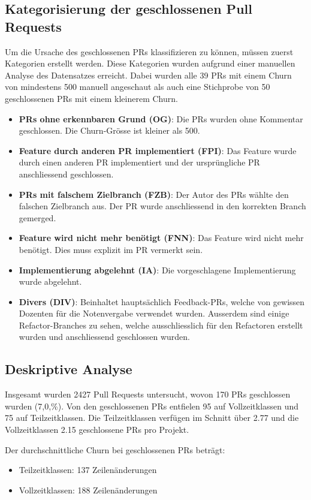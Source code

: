 \subsection{Kategorisierung der geschlossenen Pull Requests}
\label{sec:KategorienGeschlossenePRs} 
Um die Ursache des geschlossenen PRs klassifizieren zu können, müssen zuerst Kategorien erstellt werden. Diese Kategorien wurden aufgrund einer manuellen Analyse des Datensatzes erreicht. Dabei wurden alle 39 PRs mit einem Churn von mindestens 500 manuell angeschaut als auch eine Stichprobe von 50 geschlossenen PRs mit einem kleinerem Churn.
\begin{itemize}
    \item \textbf{PRs ohne erkennbaren Grund (OG)}: Die PRs wurden ohne Kommentar geschlossen. Die Churn-Grösse ist kleiner als 500.
    \item \textbf{Feature durch anderen PR implementiert (FPI)}: Das Feature wurde durch einen anderen PR implementiert und der ursprüngliche PR anschliessend geschlossen.
    \item \textbf{PRs mit falschem Zielbranch (FZB)}: Der Autor des PRs wählte den falschen Zielbranch aus. Der PR wurde anschliessend in den korrekten Branch gemerged.
    \item \textbf{Feature wird nicht mehr benötigt (FNN)}: Das Feature wird nicht mehr benötigt. Dies muss explizit im PR vermerkt sein.
    \item \textbf{Implementierung abgelehnt (IA)}: Die vorgeschlagene Implementierung wurde abgelehnt.
    \item \textbf{Divers (DIV)}: Beinhaltet hauptsächlich Feedback-PRs, welche von gewissen Dozenten für die Notenvergabe verwendet wurden. Ausserdem sind einige Refactor-Branches zu sehen, welche ausschliesslich für den Refactoren erstellt wurden und anschliessend geschlossen wurden. 
\end{itemize}

\subsection{Deskriptive Analyse}
Insgesamt wurden 2427 Pull Requests untersucht, wovon 170 PRs geschlossen wurden (7,0,\%). Von den geschlossenen PRs entfielen 95 auf Vollzeitklassen und 75 auf Teilzeitklassen. Die Teilzeitklassen verfügen im Schnitt über 2.77 und die Vollzeitklassen 2.15 geschlossene PRs pro Projekt. 

Der durchschnittliche Churn bei geschlossenen PRs beträgt: \begin{itemize} \item Teilzeitklassen: 137 Zeilenänderungen \item Vollzeitklassen: 188 Zeilenänderungen \end{itemize}

